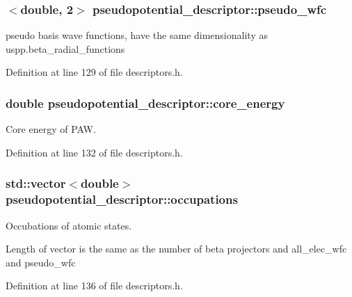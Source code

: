\subsubsection[{pseudo\+\_\+wfc}]{$<$double, 2$>$ pseudopotential\+\_\+descriptor\+::pseudo\+\_\+wfc}\label{structpseudopotential__descriptor_a6a1450bee7e75c41ce208b83942e490e}


pseudo basis wave functions, have the same dimensionality as uspp.\+beta\+\_\+radial\+\_\+functions 



Definition at line 129 of file descriptors.\+h.

\hypertarget{structpseudopotential__descriptor_a455e05af3c31216aa1a27e57b9bdca35}{}
\subsubsection[{core\+\_\+energy}]{\setlength{\rightskip}{0pt plus 5cm}double pseudopotential\+\_\+descriptor\+::core\+\_\+energy}\label{structpseudopotential__descriptor_a455e05af3c31216aa1a27e57b9bdca35}


Core energy of P\+A\+W. 



Definition at line 132 of file descriptors.\+h.

\hypertarget{structpseudopotential__descriptor_aaed84abbeec2fd1b036b4eeadf05559c}{}
\subsubsection[{occupations}]{\setlength{\rightskip}{0pt plus 5cm}std\+::vector$<$double$>$ pseudopotential\+\_\+descriptor\+::occupations}\label{structpseudopotential__descriptor_aaed84abbeec2fd1b036b4eeadf05559c}


Occubations of atomic states. 

Length of vector is the same as the number of beta projectors and all\+\_\+elec\+\_\+wfc and pseudo\+\_\+wfc 

Definition at line 136 of file descriptors.\+h.


